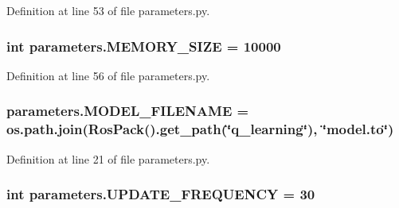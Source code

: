 Definition at line 53 of file parameters.\+py.

\subsubsection[{\texorpdfstring{M\+E\+M\+O\+R\+Y\+\_\+\+S\+I\+ZE}{MEMORY_SIZE}}]{\setlength{\rightskip}{0pt plus 5cm}int parameters.\+M\+E\+M\+O\+R\+Y\+\_\+\+S\+I\+ZE = 10000}\hypertarget{namespaceparameters_a49f1ad074b5710a98fc783c5627ddade}{}\label{namespaceparameters_a49f1ad074b5710a98fc783c5627ddade}


Definition at line 56 of file parameters.\+py.

\subsubsection[{\texorpdfstring{M\+O\+D\+E\+L\+\_\+\+F\+I\+L\+E\+N\+A\+ME}{MODEL_FILENAME}}]{\setlength{\rightskip}{0pt plus 5cm}parameters.\+M\+O\+D\+E\+L\+\_\+\+F\+I\+L\+E\+N\+A\+ME = os.\+path.\+join(Ros\+Pack().get\+\_\+path(\char`\"{}q\+\_\+learning\char`\"{}), \char`\"{}model.\+to\char`\"{})}\hypertarget{namespaceparameters_aff8b0668384f3fa2d1212d3bd0ff42fa}{}\label{namespaceparameters_aff8b0668384f3fa2d1212d3bd0ff42fa}


Definition at line 21 of file parameters.\+py.

\subsubsection[{\texorpdfstring{U\+P\+D\+A\+T\+E\+\_\+\+F\+R\+E\+Q\+U\+E\+N\+CY}{UPDATE_FREQUENCY}}]{\setlength{\rightskip}{0pt plus 5cm}int parameters.\+U\+P\+D\+A\+T\+E\+\_\+\+F\+R\+E\+Q\+U\+E\+N\+CY = 30}\hypertarget{namespaceparameters_ae3bc06467bd63647dbed9a5312495493}{}\label{namespaceparameters_ae3bc06467bd63647dbed9a5312495493}


